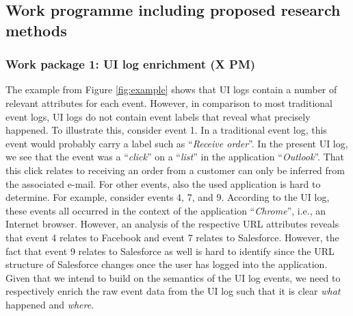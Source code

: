 \subsection{Work programme including proposed research methods}


\subsubsection{Work package 1: UI log enrichment (X PM)}
\label{sec:wp1}

The example from Figure \ref{fig:example} shows that UI logs contain a number of relevant attributes for each event. However, in comparison to most traditional event logs, UI logs do not contain event labels that reveal what precisely happened. To illustrate this, consider event 1. In a traditional event log, this event would probably carry a label such as ``\textit{Receive order}''. In the present UI log, we see that the event was a ``\textit{click}'' on a ``\textit{list}'' in the application ``\textit{Outlook}''. That this click relates to receiving an order from a customer can only be inferred from the associated e-mail. For other events, also the used application is hard to determine. For example, consider events 4, 7, and 9. According to the UI log, these events all occurred in the context of the application ``\textit{Chrome}'', i.e., an Internet browser. However, an analysis of the respective URL attributes reveals that event 4 relates to Facebook and event 7 relates to Salesforce. However, the fact that event 9 relates to Salesforce as well is hard to identify since the URL structure of Salesforce changes once the user has logged into the application. Given that we intend to build on the semantics of the UI log events, we need to respectively enrich the raw event data from the UI log such that it is clear \textit{what} happened and \textit{where}. 

